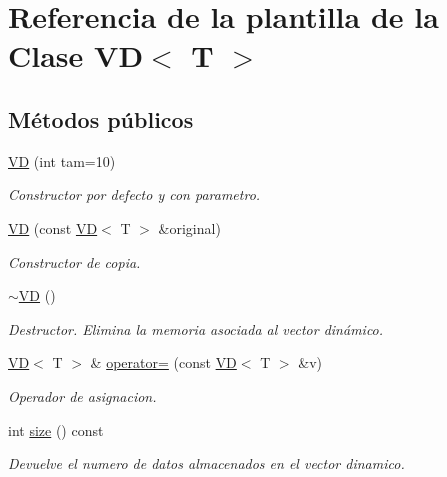 \hypertarget{classVD}{}\section{Referencia de la plantilla de la Clase VD$<$ T $>$}
\label{classVD}
\subsection*{Métodos públicos}
\begin{DoxyCompactItemize}
\item 
\hyperlink{classVD_a1ce73549d14f68caecaa593de3255c30}{VD} (int tam=10)
\begin{DoxyCompactList}\small\item\em Constructor por defecto y con parametro. \end{DoxyCompactList}\item 
\hyperlink{classVD_a4f22b92dd8ace25d50311ccd61508dfc}{VD} (const \hyperlink{classVD}{VD}$<$ T $>$ \&original)
\begin{DoxyCompactList}\small\item\em Constructor de copia. \end{DoxyCompactList}\item 
\mbox{\label{classVD_a0533f99aa2fee31fde63edd6c4b8bb2d}} 
\hyperlink{classVD_a0533f99aa2fee31fde63edd6c4b8bb2d}{$\sim$\+VD} ()
\begin{DoxyCompactList}\small\item\em Destructor. Elimina la memoria asociada al vector dinámico. \end{DoxyCompactList}\item 
\hyperlink{classVD}{VD}$<$ T $>$ \& \hyperlink{classVD_a645b65a6343059cd921f6a2856c97249}{operator=} (const \hyperlink{classVD}{VD}$<$ T $>$ \&v)
\begin{DoxyCompactList}\small\item\em Operador de asignacion. \end{DoxyCompactList}\item 
\mbox{\label{classVD_a411ad026db1c8e0617d9031f1f1017a5}} 
int \hyperlink{classVD_a411ad026db1c8e0617d9031f1f1017a5}{size} () const
\begin{DoxyCompactList}\small\item\em Devuelve el numero de datos almacenados en el vector dinamico. \end{DoxyCompactList}\item 

\end{DoxyCompactItemize}
